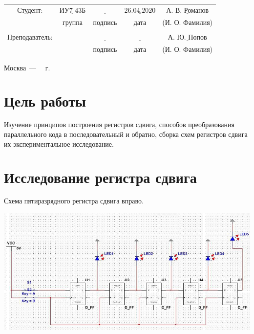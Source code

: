 \documentclass[a4paper,12pt]{article}
\begin{document}
\begin{center}
	\begin{tabular}{ccccc}
		Студент: & $\underline{\text{ИУ7-43Б}}$ & $\underline{\text{~~~~~~~~~~~}}$ & $\underline{\text{26.04.2020}}$ & $\underline{\text{А. В. Романов}}$ \\
		 & \footnotesize группа & \footnotesize подпись & \footnotesize дата  & \footnotesize (И. О. Фамилия) \\
		  &  &  &  & \\
		Преподаватель: & \textbf{} & $\underline{\text{~~~~~~~~~~~}}$ & $\underline{\text{~~~~~~~~~~~~}}$ & $\underline{\text{А. Ю. Попов}}$ \\
		&  & \footnotesize подпись & \footnotesize дата  & \footnotesize (И. О. Фамилия) \\
	\end{tabular}
\end{center}


\begin{center}
	\vfill
	Москва~---~\the\year
~г.
\end{center}
\clearpage

\section{Цель работы} Изучение принципов построения регистров сдвига, способов преобразования параллельного кода в последовательный и обратно, сборка схем регистров сдвига их экспериментальное исследование. 

\section{Исследование регистра сдвига}
Схема пятиразрядного регистра сдвига вправо.
\begin{center}
	\includegraphics[scale=0.6]{../screens/1.jpg}
\end{center}
\end{document}
